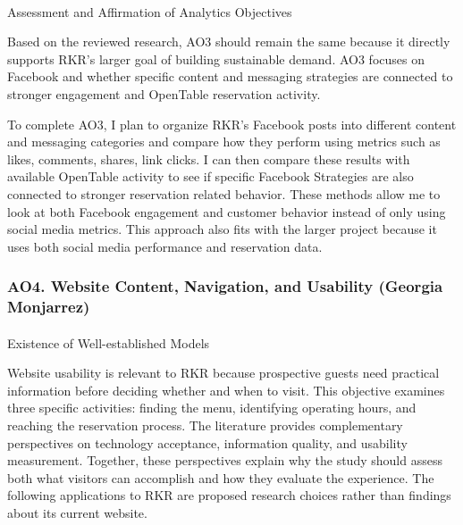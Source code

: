 \documentclass[
  12pt,
  letterpaper,
  DIV=11,
  numbers=noendperiod]{scrartcl}
\makeatletter
\let\oldparagraph\paragraph
\renewcommand{\paragraph}{
    \@ifstar
      \xxxParagraphStar
      \xxxParagraphNoStar
  }
\newcommand{\xxxParagraphStar}[1]{\oldparagraph*{#1}\mbox{}}
\newcommand{\xxxParagraphNoStar}[1]{\oldparagraph{#1}\mbox{}}
\makeatother
\begin{document}
\paragraph{Assessment and Affirmation of Analytics
Objectives}\label{assessment-and-affirmation-of-analytics-objectives-2}

Based on the reviewed research, AO3 should remain the same because it
directly supports RKR's larger goal of building sustainable demand. AO3
focuses on Facebook and whether specific content and messaging
strategies are connected to stronger engagement and OpenTable
reservation activity.~

To complete AO3, I plan to organize RKR's Facebook posts into different
content and messaging categories and compare how they perform using
metrics such as likes, comments, shares, link clicks. I can then compare
these results with available OpenTable activity to see if specific
Facebook Strategies are also connected to stronger reservation related
behavior. These methods allow me to look at both Facebook engagement and
customer behavior instead of only using social media metrics. This
approach also fits with the larger project because it uses both social
media performance and reservation data.~

\subsubsection{AO4. Website Content, Navigation, and Usability (Georgia
Monjarrez)}\label{ao4.-website-content-navigation-and-usability-georgia-monjarrez}

\paragraph{Existence of Well-established
Models}\label{existence-of-well-established-models-2}

Website usability is relevant to RKR because prospective guests need
practical information before deciding whether and when to visit. This
objective examines three specific activities: finding the menu,
identifying operating hours, and reaching the reservation process. The
literature provides complementary perspectives on technology acceptance,
information quality, and usability measurement. Together, these
perspectives explain why the study should assess both what visitors can
accomplish and how they evaluate the experience. The following
applications to RKR are proposed research choices rather than findings
about its current website.
\end{document}
